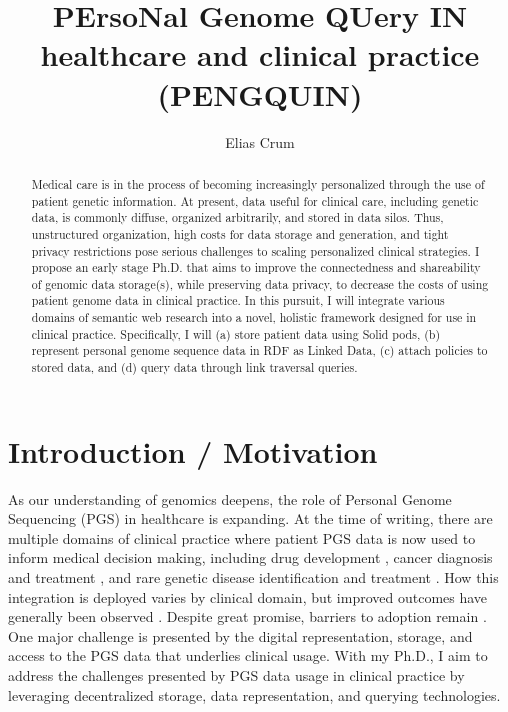 \documentclass[runningheads]{llncs}
\begin{document}
\title{PErsoNal Genome QUery IN healthcare and clinical practice (PENGQUIN)}

\author{Elias Crum}



\maketitle

\begin{abstract}
    Medical care is in the process of becoming increasingly personalized through the use of patient genetic information. 
    At present, data useful for clinical care, including genetic data, is commonly diffuse, organized arbitrarily, and stored in data silos. 
    Thus, unstructured organization, high costs for data storage and generation, and tight privacy restrictions pose serious challenges to scaling personalized clinical strategies.
    I propose an early stage Ph.D. that aims to improve the connectedness and shareability of genomic data storage(s), while preserving data privacy, to decrease the costs of using patient genome data in clinical practice. 
    In this pursuit, I will integrate various domains of semantic web research into a novel, holistic framework designed for use in clinical practice.
    Specifically, I will (a) store patient data using Solid pods, (b) represent personal genome sequence data in RDF as Linked Data, (c) attach policies to stored data, and (d) query data through link traversal queries.


\end{abstract}


\section{Introduction / Motivation}
As our understanding of genomics deepens, the role of Personal Genome Sequencing (PGS) in healthcare is expanding. 
At the time of writing, there are multiple domains of clinical practice where patient PGS data is now used to inform medical decision making, including drug development \cite{ko_new_2022}, cancer diagnosis and treatment \cite{mcleod_cancer_2013}, and rare genetic disease identification and treatment \cite{marwaha_guide_2022}.
How this integration is deployed varies by clinical domain, but improved outcomes have generally been observed \cite{mathur_personalized_2017}.
Despite great promise, barriers to adoption remain \cite{stefanicka-wojtas_barriers_2023}. 
One major challenge is presented by the digital representation, storage, and access to the PGS data that underlies clinical usage.
With my Ph.D., I aim to address the challenges presented by PGS data usage in clinical practice by leveraging decentralized storage, data representation, and querying technologies.
\end{document}
